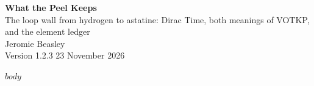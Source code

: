 \documentclass[11pt]{article}
\begin{document}
\begin{center}{\LARGE\bfseries What the Peel Keeps}\\[4pt]{\large The loop wall from hydrogen to astatine: Dirac Time, both meanings of VOTKP, and the element ledger}\\[10pt]{\large Jeromie Beasley}\\[2pt]{\small Version 1.2.3 \textperiodcentered{} 23 November 2026}\end{center}\vspace{6pt}
$body$
\end{document}
